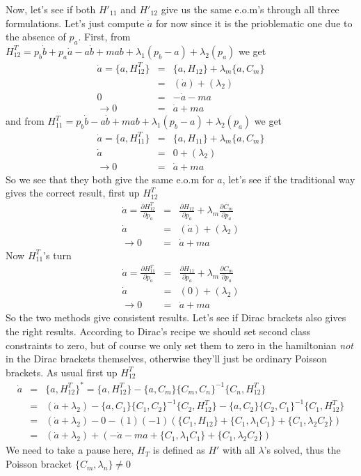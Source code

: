 \documentclass[aps,preprint,preprintnumbers,nofootinbib,showpacs,prd]{revtex4-1}
\newcommand{\nbea}{\begin{eqnarray*}}
\newcommand{\neea}{\end{eqnarray*}}
\begin{document}
Now, let's see if both $H'_{11}$ and $H'_{12}$ give us the same e.o.m's through all three formulations. Let's just compute $\dot a$ for now since it is the prioblematic one due to the absence of $p_a$. First, from $H^T_{12} = p_b \dot b + p_a \dot a - a\dot b + mab + \lambda_1 (p_b - a) + \lambda_2 (p_a)$ we get
%
\nbea
\dot a = \{a, H^T_{12}\} & = & \{a, H_{12}\} + \lambda_m \{a, C_m\} \\
& = & (\dot a) + (\lambda_2) \\
0 & = & - \dot a - ma \\
\to 0 & = & \dot a + ma
\neea
%
and from $H^T_{11} = p_b \dot b - a\dot b + mab + \lambda_1 (p_b - a) + \lambda_2 (p_a)$ we get
%
\nbea
\dot a  = \{a, H^T_{11}\} & = & \{a, H_{11}\} + \lambda_m \{a, C_m\} \\
\dot a & = & 0 + (\lambda_2) \\
\to 0 & = & \dot a + ma
\neea
%
So we see that they both give the same e.o.m for $a$, let's see if the traditional way gives the correct result, first up $H^T_{12}$
%
\nbea
\dot a = \frac{\partial H^T_{12}}{\partial p_a} & = & \frac{\partial H_{12}}{\partial p_a} + \lambda_m \frac{\partial C_m}{\partial p_a} \\
\dot a & = &  (\dot a) + (\lambda_2) \\
\to 0 & = & \dot a + ma
\neea
%
Now $H^T_{11}$'s turn
%
\nbea
\dot a = \frac{\partial H^T_{11}}{\partial p_a} & = & \frac{\partial H_{11}}{\partial p_a} + \lambda_m \frac{\partial C_m}{\partial p_a} \\
\dot a & = &  (0) + (\lambda_2) \\
\to 0 & = & \dot a + ma
\neea
%
So the two methods give consistent results. Let's see if Dirac brackets also gives the right results. According to Dirac's recipe we should set second class constraints to zero, but of course we only set them to zero in the hamiltonian {\it not} in the Dirac brackets themselves, otherwise they'll just be ordinary Poisson brackets. As usual first up $H^T_{12}$
%
\nbea
\dot a & = & \{a, H^T_{12}\}^* = \{a, H^T_{12}\} - \{a, C_m\}\{C_m, C_n\}^{-1}\{C_n, H^T_{12}\} \\
& = & (\dot a + \lambda_2) - \{a, C_1\}\{C_1, C_2\}^{-1}\{C_2, H^T_{12}\} - \{a, C_2\}\{C_2, C_1\}^{-1}\{C_1, H^T_{12}\} \\
& = & (\dot a + \lambda_2) - 0 - (1)(-1) (\{C_1, H_{12}\} + \{C_1, \lambda_1 C_1\} + \{C_1, \lambda_2 C_2\} )\\
& = & (\dot a + \lambda_2) + (-\dot a -ma + \{C_1, \lambda_1 C_1\} + \{C_1, \lambda_2 C_2\} )
\neea
%
We need to take a pause here, $H_T$ is defined as $H'$ with all $\lambda$'s solved, thus the Poisson bracket $\{C_m, \lambda_n\} \neq 0$
\end{document}
